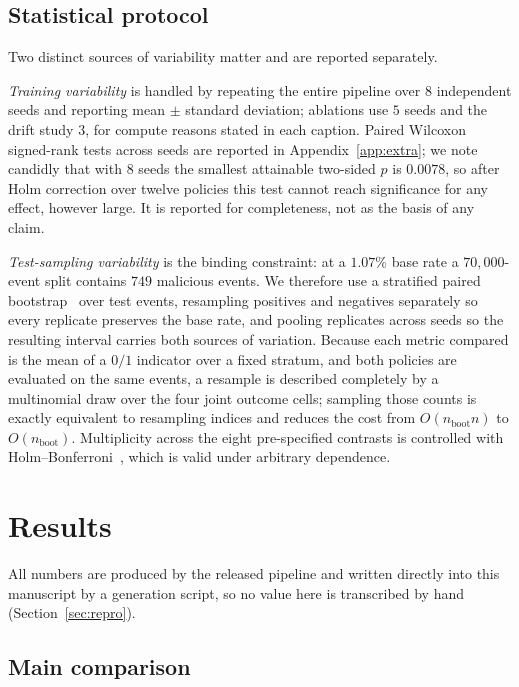 \documentclass[conference]{IEEEtran}
\begin{document}
\subsection{Statistical protocol}
\label{sec:stats}

Two distinct sources of variability matter and are reported separately.

\emph{Training variability} is handled by repeating the entire pipeline over
$8$ independent seeds and reporting mean $\pm$ standard deviation; ablations
use $5$ seeds and the drift study $3$, for compute reasons stated in each
caption. Paired Wilcoxon signed-rank tests across seeds are reported in
Appendix~\ref{app:extra}; we note candidly that with $8$ seeds the smallest
attainable two-sided $p$ is $0.0078$, so after Holm correction over twelve
policies this test cannot reach significance for any effect, however large.
It is reported for completeness, not as the basis of any claim.

\emph{Test-sampling variability} is the binding constraint: at a $1.07\%$ base
rate a $70{,}000$-event split contains $749$ malicious events. We therefore use
a stratified paired bootstrap~\cite{efron1994} over test events, resampling
positives and negatives separately so every replicate preserves the base rate,
and pooling replicates across seeds so the resulting interval carries both
sources of variation. Because each metric compared is the mean of a $0/1$
indicator over a fixed stratum, and both policies are evaluated on the same
events, a resample is described completely by a multinomial draw over the four
joint outcome cells; sampling those counts is exactly equivalent to resampling
indices and reduces the cost from $O(n_{\text{boot}}n)$ to
$O(n_{\text{boot}})$. Multiplicity across the eight pre-specified contrasts is
controlled with Holm--Bonferroni~\cite{holm1979}, which is valid under
arbitrary dependence.
\section{Results}
\label{sec:results}

All numbers are produced by the released pipeline and written directly into
this manuscript by a generation script, so no value here is transcribed by
hand (Section~\ref{sec:repro}).

\subsection{Main comparison}
\label{sec:results-policy}
\end{document}
